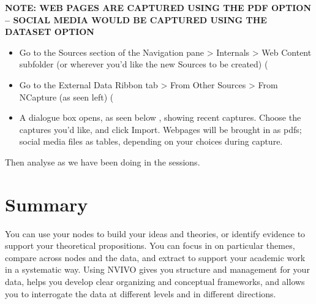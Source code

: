 \documentclass[]{book}
\providecommand{\tightlist}{%
  \setlength{\itemsep}{0pt}\setlength{\parskip}{0pt}}
\theoremstyle{definition}
\theoremstyle{definition}
\theoremstyle{definition}
\theoremstyle{remark}
\begin{document}
\textbf{NOTE: WEB PAGES ARE CAPTURED USING THE PDF OPTION -- SOCIAL
MEDIA WOULD BE CAPTURED USING THE DATASET OPTION}

\begin{itemize}
\tightlist
\item
  Go to the Sources section of the Navigation pane \textgreater{}
  Internals \textgreater{} Web Content subfolder (or wherever you'd like
  the new Sources to be created) (
\item
  Go to the External Data Ribbon tab \textgreater{} From Other Sources
  \textgreater{} From NCapture (as seen left) (
\item
  A dialogue box opens, as seen below , showing recent captures. Choose
  the captures you'd like, and click Import. Webpages will be brought in
  as pdfs; social media files as tables, depending on your choices
  during capture.
\end{itemize}

Then analyse as we have been doing in the sessions.

\hypertarget{summary-8}{%
\section{Summary}\label{summary-8}}

You can use your nodes to build your ideas and theories, or identify
evidence to support your theoretical propositions. You can focus in on
particular themes, compare across nodes and the data, and extract to
support your academic work in a systematic way. Using NVIVO gives you
structure and management for your data, helps you develop clear
organizing and conceptual frameworks, and allows you to interrogate the
data at different levels and in different directions.


\end{document}
